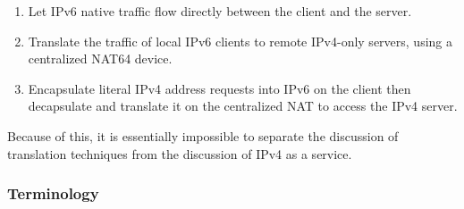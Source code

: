 \documentclass[
]{article}
\providecommand{\tightlist}{%
  \setlength{\itemsep}{0pt}\setlength{\parskip}{0pt}}
\begin{document}
\begin{enumerate}
\def\labelenumi{\arabic{enumi}.}
\tightlist
\item
  Let IPv6 native traffic flow directly between the client and the
  server.
\item
  Translate the traffic of local IPv6 clients to remote IPv4-only
  servers, using a centralized NAT64 device.
\item
  Encapsulate literal IPv4 address requests into IPv6 on the client then
  decapsulate and translate it on the centralized NAT to access the IPv4
  server.
\end{enumerate}

Because of this, it is essentially impossible to separate the discussion
of translation techniques from the discussion of IPv4 as a service.

\subsubsection{Terminology}\label{terminology}
\end{document}

